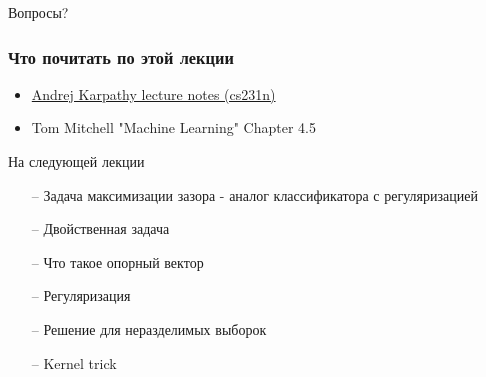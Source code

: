 \documentclass[10pt]{beamer}
\begin{document}
\begin{frame}[standout]
  Вопросы?
\end{frame}

\appendix

\begin{frame}\frametitle{Что почитать по этой лекции}
  \begin{itemize}
    \item \href{http://cs231n.github.io/neural-networks-1/}{Andrej Karpathy lecture notes (cs231n)}
    \item Tom Mitchell "Machine Learning" Chapter 4.5
  \end{itemize}
\end{frame}

\begin{frame}{На следующей лекции}
	\begin{itemize}
	  	\item[--] Задача максимизации зазора - аналог классификатора с регуляризацией
    \item[--] Двойственная задача 
    \item[--] Что такое опорный вектор
    \item[--] Регуляризация
    \item[--] Решение для неразделимых выборок
    \item[--] Kernel trick    
	\end{itemize}
\end{frame}
\end{document}
